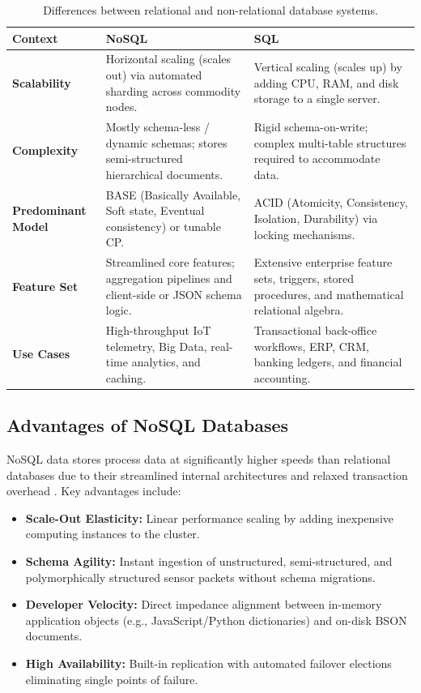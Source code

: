 \documentclass[11pt,a4paper]{article}
\begin{document}
\begin{table}[htbp]
\centering
\small
\caption{Differences between relational and non-relational database systems.}
\label{tab:sql_vs_nosql}
\renewcommand{\arraystretch}{1.2}
\begin{tabularx}{\linewidth}{l p{5.5cm} X}
\toprule
\textbf{Context} & \textbf{NoSQL} & \textbf{SQL} \\
\midrule
\textbf{Scalability} & Horizontal scaling (scales out) via automated sharding across commodity nodes. & Vertical scaling (scales up) by adding CPU, RAM, and disk storage to a single server. \\
\addlinespace
\textbf{Complexity} & Mostly schema-less / dynamic schemas; stores semi-structured hierarchical documents. & Rigid schema-on-write; complex multi-table structures required to accommodate data. \\
\addlinespace
\textbf{Predominant Model} & BASE (Basically Available, Soft state, Eventual consistency) or tunable CP. & ACID (Atomicity, Consistency, Isolation, Durability) via locking mechanisms. \\
\addlinespace
\textbf{Feature Set} & Streamlined core features; aggregation pipelines and client-side or JSON schema logic. & Extensive enterprise feature sets, triggers, stored procedures, and mathematical relational algebra. \\
\addlinespace
\textbf{Use Cases} & High-throughput IoT telemetry, Big Data, real-time analytics, and caching. & Transactional back-office workflows, ERP, CRM, banking ledgers, and financial accounting. \\
\bottomrule
\end{tabularx}
\end{table}

\subsection{Advantages of NoSQL Databases}
NoSQL data stores process data at significantly higher speeds than relational databases due to their streamlined internal architectures and relaxed transaction overhead \citep{leavitt2010}. Key advantages include:
\begin{itemize}[noitemsep]
    \item \textbf{Scale-Out Elasticity:} Linear performance scaling by adding inexpensive computing instances to the cluster.
    \item \textbf{Schema Agility:} Instant ingestion of unstructured, semi-structured, and polymorphically structured sensor packets without schema migrations.
    \item \textbf{Developer Velocity:} Direct impedance alignment between in-memory application objects (e.g., JavaScript/Python dictionaries) and on-disk BSON documents.
    \item \textbf{High Availability:} Built-in replication with automated failover elections eliminating single points of failure.
\end{itemize}
\end{document}
